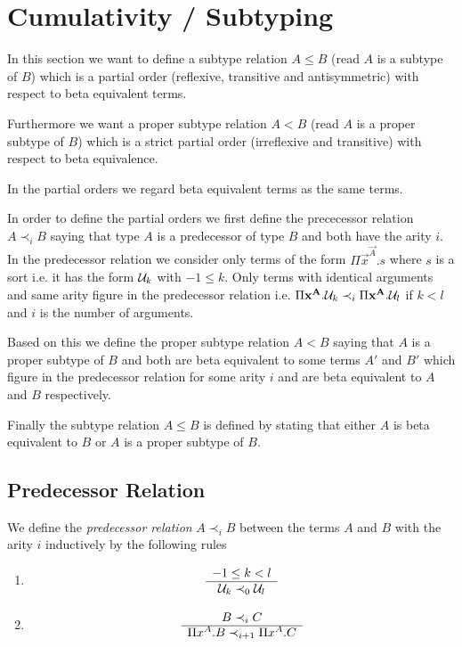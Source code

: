 \section{Cumulativity / Subtyping}

In this section we want to define a subtype relation $A \le B$ (read $A$ is a
subtype of $B$) which is a partial order (reflexive, transitive and
antisymmetric) with respect to beta equivalent terms.

Furthermore we want a proper subtype relation $A < B$ (read $A$ is a proper
subtype of $B$) which is a strict partial order (irreflexive and transitive)
with respect to beta equivalence.

In the partial orders we regard beta equivalent terms as the same terms.

In order to define the partial orders we first define the prececessor relation
$A \prec_i B$ saying that type $A$ is a predecessor of type $B$ and both have
the arity $i$. In the predecessor relation we consider only terms of the form
$\Pi \vec{x}^\vec{A}. s$ where $s$ is a sort i.e. it has the form ${\cal U}_k$ with
$-1 \le k$. Only terms with identical arguments and same arity figure in the
predecessor relation i.e. $\Pi {\mathbf x}^{\mathbf A}. {\cal U}_k \prec_i \Pi
{\mathbf x}^{\mathbf A}. {\cal U}_l$ if $k < l$ and $i$ is the number of arguments.

Based on this we define the proper subtype relation $A < B$ saying that $A$ is a
proper subtype of $B$ and both are beta equivalent to some terms $A'$ and $B'$
which figure in the predecessor relation for some arity $i$ and are beta
equivalent to $A$ and $B$ respectively.

Finally the subtype relation $A \le B$ is defined by stating that either $A$ is
beta equivalent to $B$ or $A$ is a proper subtype of $B$.



\subsection{Predecessor Relation}

\begin{definition}
    We define the
    \emph{predecessor relation}
    $A \prec_i B$ between the terms $A$
    and $B$ with the arity $i$ inductively by the following rules
    \begin{enumerate}
    \item
        $$
        \begin{array}{c} 
            -1 \le k < l
         \\ \hline 
            {\cal U}_k \prec_0 {\cal U}_l
        \end{array}
        $$

    \item
        $$
        \begin{array}{c} 
            B \prec_i C
         \\ \hline 
            \Pi x^A. B \prec_{i+1} \Pi x^A. C
        \end{array}
        $$
    \end{enumerate}
\end{definition}



